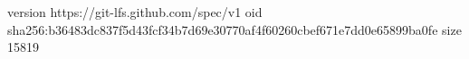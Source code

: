 version https://git-lfs.github.com/spec/v1
oid sha256:b36483dc837f5d43fcf34b7d69e30770af4f60260cbef671e7dd0e65899ba0fe
size 15819

